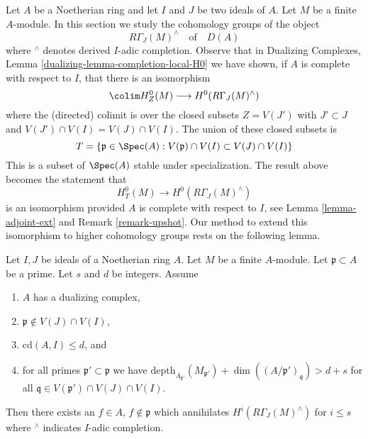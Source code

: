 \noindent
Let $A$ be a Noetherian ring and let $I$ and $J$ be two ideals of $A$.
Let $M$ be a finite $A$-module. In this section we study the
cohomology groups of the object
$$
R\Gamma_J(M)^\wedge
\quad\text{of}\quad
D(A)
$$
where ${}^\wedge$ denotes derived $I$-adic completion. Observe that in
Dualizing Complexes, Lemma \ref{dualizing-lemma-completion-local-H0}
we have shown, if $A$ is complete with respect to $I$,
that there is an isomorphism
$$
\colim H^0_Z(M) \longrightarrow H^0(R\Gamma_J(M)^\wedge)
$$
where the (directed) colimit is over the closed subsets $Z = V(J')$
with $J' \subset J$ and $V(J') \cap V(I) = V(J) \cap V(I)$.
The union of these closed subsets is
\begin{equation}
\label{equation-associated-subset}
T = \{\mathfrak p \in \Spec(A) :
V(\mathfrak p) \cap V(I) \subset V(J) \cap V(I)\}
\end{equation}
This is a subset of $\Spec(A)$ stable under specialization.
The result above becomes the statement that
$$
H^0_T(M) \longrightarrow H^0(R\Gamma_J(M)^\wedge)
$$
is an isomorphism provided $A$ is complete with respect to $I$, see
Lemma \ref{lemma-adjoint-ext} and
Remark \ref{remark-upshot}.
Our method to extend this isomorphism to higher cohomology groups
rests on the following lemma.

\begin{lemma}
\label{lemma-kill-completion-general}
Let $I, J$ be ideals of a Noetherian ring $A$.
Let $M$ be a finite $A$-module. Let $\mathfrak p \subset A$ be a prime.
Let $s$ and $d$ be integers. Assume
\begin{enumerate}
\item $A$ has a dualizing complex,
\item $\mathfrak p \not \in V(J) \cap V(I)$,
\item $\text{cd}(A, I) \leq d$, and
\item for all primes $\mathfrak p' \subset \mathfrak p$
we have
$\text{depth}_{A_{\mathfrak p'}}(M_{\mathfrak p'}) +
\dim((A/\mathfrak p')_\mathfrak q) > d + s$
for all $\mathfrak q \in V(\mathfrak p') \cap V(J) \cap V(I)$.
\end{enumerate}
Then there exists an $f \in A$, $f \not \in \mathfrak p$ which annihilates
$H^i(R\Gamma_J(M)^\wedge)$ for $i \leq s$ where ${}^\wedge$
indicates $I$-adic completion.
\end{lemma}

